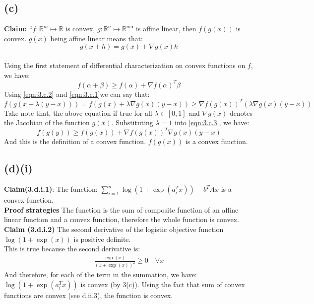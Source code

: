 \documentclass[]{article}
\begin{document}
\subsection*{(c)}
    \textbf{Claim:} ``$f: \mathbb{R}^m \mapsto
    \mathbb{R}$ is convex, $g: \mathbb{R}^n \mapsto \mathbb{R}^m$" is affine linear, then $f(g(x))$ is convex.
    $g(x)$ being affine linear means that:
    \begin{equation}\label{eqn:3.c.1}\tag{3.c.1}
        g(x + h) = g(x) + \nabla g(x)h
    \end{equation}
    \\
    Using the first statement of differential characterization on convex functions on $f$, we have:
    \begin{equation}\label{eqn:3.c.2}\tag{3.c.2}
        f(\alpha + \beta) \ge f(\alpha) + \nabla f(\alpha)^T\beta
    \end{equation}
    Using \ref{eqn:3.c.2} and \ref{eqn:3.c.1}we can say that:
    \begin{equation}\label{eqn:3.c.3}\tag{3.c.3}
        f(g(x + \lambda(y - x))) = f(g(x) + \lambda \nabla g(x)(y - x))
        \ge \nabla f(g(x))^T(\lambda \nabla g(x)(y - x))
    \end{equation}
    Take note that, the above equation if true for all $\lambda \in [0, 1]$ and $\nabla g(x)$ denotes the Jacobian of the function $g(x)$. Substituting $\lambda = 1$ into \ref{eqn:3.c.3}, we have:
    $$
        f(g(y)) \ge f(g(x)) + \nabla f(g(x))^T\nabla g(x)(y - x)
    $$
    And this is the definition of a convex function. $f(g(x))$ is a convex function.

     

\subsection*{(d)(i)}
    \textbf{Claim(3.d.i.1)}: The function:
    $
    \sum_{i = 1}^n \log(1 + \exp(a_i^Tx)) - b^TAx
    $
    is a convex function.
    \\
    \textbf{Proof strategies} The function is the sum of composite function of an affine linear function and a convex function, therefore the whole function is convex. 
    \\
    \textbf{Claim (3.d.i.2)} The second derivative of the logistic objective function $\log(1 + \exp(x))$ is positive definite.
    \\
    This is true because the second derivative is:
    \begin{align*}
        \frac{\exp(x)}{(1 + \exp(x))^2} \ge 0 \quad \forall x
    \end{align*}
    And therefore, for each of the term in the summation, we have: $\log(1 + \exp(a_i^Tx))$ is convex (by 3(c)). Using the fact that sum of convex functions are convex (see d.ii.3), the function is convex. 
\end{document}
